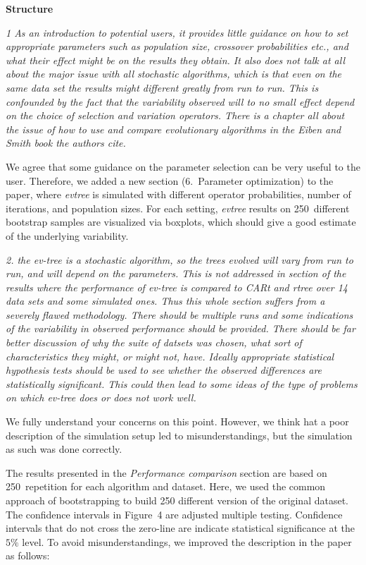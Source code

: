 \documentclass[DIN, pagenumber=false, parskip=half,%
               fromalign=left, fromphone=true,%
               fromemail=true, fromurl=false, %
               fromlogo=true, fromrule=false, fromrule=afteraddress]{scrlttr2}
\begin{document}
\textbf{Structure}

\textit{1 As an introduction to potential users,  it provides little 
guidance on how to set appropriate parameters
such as population size,  crossover probabilities etc.,  and what 
their effect might be on the results they obtain.  It also does not 
talk at all about the major issue with all  stochastic algorithms, 
which is that even on the same data set the results might different 
greatly from run to run. This is confounded by the fact that the 
variability observed will to no small effect depend on the choice 
of selection and variation operators.  There is a chapter all about 
the issue of how to use and compare evolutionary algorithms in 
the Eiben and Smith book the authors cite.} 

We agree that some guidance on the parameter selection can be very useful to the user.
Therefore, we added a new section (6.~Parameter optimization) to the paper, where \textit{evtree} is simulated
with different operator probabilities, number of iterations, and population
sizes. For each setting, \textit{evtree} results on 250~different bootstrap samples are visualized via
boxplots, which should give a good estimate of the underlying variability.


\textit{2.  the ev-tree is a stochastic algorithm,  so the trees evolved 
will vary from run to run,  and will depend on the parameters.  
This is not addressed in section of the results where the performance 
of ev-tree is compared to CARt and rtree over 14 data sets and some 
simulated ones.  Thus this whole section suffers from a  severely 
flawed methodology.   There should be multiple runs and some 
indications of the variability in observed performance should be 
provided. There should be far better discussion of why the suite 
of datsets was chosen, what sort of characteristics they might, or 
might not, have.  Ideally appropriate statistical hypothesis tests 
should be used to see whether the observed differences are 
statistically significant.  This could then lead to some ideas of 
the type of problems on which ev-tree does or does not work well.
}

We fully understand your concerns on this point. However, we think
hat a poor description of the simulation setup led to misunderstandings, but 
the simulation as such was done correctly.

The results presented in the \textit{Performance  comparison} section are based
on 250~repetition for each algorithm and dataset. Here, we used the common approach of
bootstrapping to build 250 different version of the original dataset. The confidence intervals
in Figure~4 are adjusted multiple testing. Confidence intervals that do not cross the zero-line are 
indicate statistical significance at the $5\%$ level. To avoid misunderstandings, we improved 
the description in the paper as follows:
\end{document}
